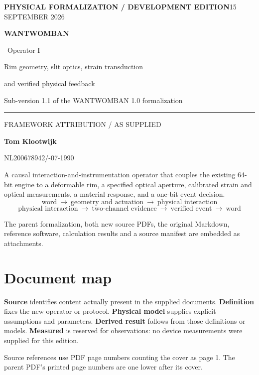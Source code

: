 \documentclass[10pt,a4paper]{article}
\numberwithin{equation}{section}
\newcommand{\newpart}{\clearpage}
\begin{document}
\thispagestyle{empty}
{\small\bfseries\color{accent}PHYSICAL FORMALIZATION / DEVELOPMENT EDITION}\hfill{\small 15 SEPTEMBER 2026}
\vspace*{27mm}

{\fontsize{35}{39}\selectfont\bfseries WANTWOMBAN}\par
\vspace{7mm}
{\fontsize{29}{34}\selectfont\color{accent}\textbar\ Operator I}\par
\vspace{9mm}
{\Large Rim geometry, slit optics, strain transduction\par
and verified physical feedback}\par
\vspace{7mm}
{\large Sub-version 1.1 of the WANTWOMBAN 1.0 formalization}

\vspace{15mm}
\noindent\textcolor{accent}{\rule{\linewidth}{0.8pt}}
\vspace{7mm}
{\small\color{muted}FRAMEWORK ATTRIBUTION / AS SUPPLIED}\par
{\Large\bfseries Tom Klootwijk}\par
{\normalsize NL200678942\quad /-07-1990}

\vfill
\begin{keybox}
A causal interaction-and-instrumentation operator that couples the existing 64-bit engine to a deformable rim, a specified optical aperture, calibrated strain and optical measurements, a material response, and a one-bit event decision.
\[
\text{word}\ \longrightarrow\ \text{geometry and actuation}\ \longrightarrow\ \text{physical interaction}
\]
\[
\text{physical interaction}\ \longrightarrow\ \text{two-channel evidence}\ \longrightarrow\ \text{verified event}\ \longrightarrow\ \text{word}
\]
\end{keybox}
\vspace{4mm}
{\small The parent formalization, both new source PDFs, the original Markdown, reference software, calculation results and a source manifest are embedded as attachments.}

\newpart
\section*{Document map}
\begingroup
\small
\setlength{\parskip}{0pt}
\makeatletter
\renewcommand{\l@section}[2]{\vskip .50em\@dottedtocline{1}{0em}{2em}{\bfseries #1}{#2}}
\makeatother
\endgroup
\vfill
\begin{keybox}
\textbf{Source} identifies content actually present in the supplied documents. \textbf{Definition} fixes the new operator or protocol. \textbf{Physical model} supplies explicit assumptions and parameters. \textbf{Derived result} follows from those definitions or models. \textbf{Measured} is reserved for observations: no device measurements were supplied for this edition.

Source references use PDF page numbers counting the cover as page 1. The parent PDF's printed page numbers are one lower after its cover.
\end{keybox}
\end{document}
